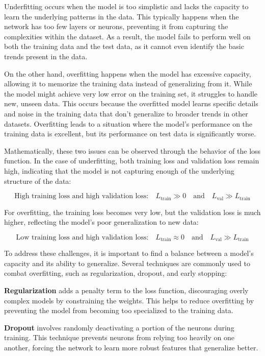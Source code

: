 Underfitting occurs when the model is too simplistic and lacks the capacity to learn the underlying patterns in the data. This typically happens when the network has too few layers or neurons, preventing it from capturing the complexities within the dataset. As a result, the model fails to perform well on both the training data and the test data, as it cannot even identify the basic trends present in the data.

On the other hand, overfitting happens when the model has excessive capacity, allowing it to memorize the training data instead of generalizing from it. While the model might achieve very low error on the training set, it struggles to handle new, unseen data. This occurs because the overfitted model learns specific details and noise in the training data that don't generalize to broader trends in other datasets. Overfitting leads to a situation where the model's performance on the training data is excellent, but its performance on test data is significantly worse.

Mathematically, these two issues can be observed through the behavior of the loss function. In the case of underfitting, both training loss and validation loss remain high, indicating that the model is not capturing enough of the underlying structure of the data:

\[
\text{High training loss and high validation loss:} \quad L_{\text{train}} \gg 0 \quad \text{and} \quad L_{\text{val}} \gg L_{\text{train}}
\]

For overfitting, the training loss becomes very low, but the validation loss is much higher, reflecting the model's poor generalization to new data:

\[
\text{Low training loss and high validation loss:} \quad L_{\text{train}} \approx 0 \quad \text{and} \quad L_{\text{val}} \gg L_{\text{train}}
\]

To address these challenges, it is important to find a balance between a model's capacity and its ability to generalize. Several techniques are commonly used to combat overfitting, such as regularization, dropout, and early stopping:

\textbf{Regularization} adds a penalty term to the loss function, discouraging overly complex models by constraining the weights. This helps to reduce overfitting by preventing the model from becoming too specialized to the training data.
  
\textbf{Dropout} involves randomly deactivating a portion of the neurons during training. This technique prevents neurons from relying too heavily on one another, forcing the network to learn more robust features that generalize better.
  
